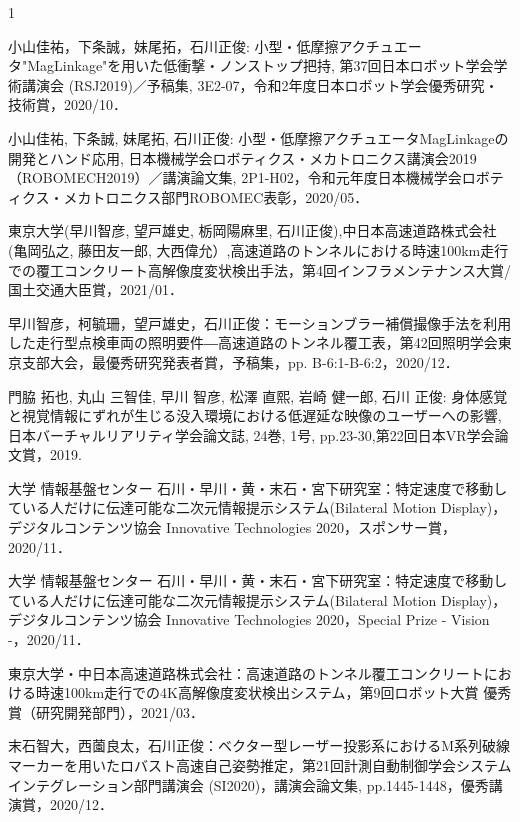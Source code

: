 \begin{受賞}{1}

小山佳祐，下条誠，妹尾拓，石川正俊: 小型・低摩擦アクチュエータ"MagLinkage"を用いた低衝撃・ノンストップ把持, 第37回日本ロボット学会学術講演会 (RSJ2019)／予稿集, 3E2-07，令和2年度日本ロボット学会優秀研究・技術賞，2020/10．

小山佳祐, 下条誠, 妹尾拓, 石川正俊: 小型・低摩擦アクチュエータMagLinkageの開発とハンド応用, 日本機械学会ロボティクス・メカトロニクス講演会2019（ROBOMECH2019）／講演論文集, 2P1-H02，令和元年度日本機械学会ロボティクス・メカトロニクス部門ROBOMEC表彰，2020/05．

東京大学(早川智彦, 望戸雄史, 栃岡陽麻里, 石川正俊),中日本高速道路株式会社(亀岡弘之, 藤田友一郎, 大西偉允）,高速道路のトンネルにおける時速100km走行での覆工コンクリート高解像度変状検出手法，第4回インフラメンテナンス大賞/国土交通大臣賞，2021/01．

早川智彦，柯毓珊，望戸雄史，石川正俊：モーションブラー補償撮像手法を利用した走行型点検車両の照明要件―高速道路のトンネル覆工表，第42回照明学会東京支部大会，最優秀研究発表者賞，予稿集，pp. B-6:1-B-6:2，2020/12．

門脇 拓也, 丸山 三智佳, 早川 智彦, 松澤 直熙, 岩崎 健一郎, 石川 正俊: 身体感覚と視覚情報にずれが生じる没入環境における低遅延な映像のユーザーへの影響,日本バーチャルリアリティ学会論文誌, 24巻, 1号, pp.23-30,第22回日本VR学会論文賞，2019.

大学 情報基盤センター 石川・早川・黄・末石・宮下研究室：特定速度で移動している人だけに伝達可能な二次元情報提示システム(Bilateral Motion Display)，デジタルコンテンツ協会 Innovative Technologies 2020，スポンサー賞，2020/11．

大学 情報基盤センター 石川・早川・黄・末石・宮下研究室：特定速度で移動している人だけに伝達可能な二次元情報提示システム(Bilateral Motion Display)，デジタルコンテンツ協会 Innovative Technologies 2020，Special Prize - Vision -，2020/11．

東京大学・中日本高速道路株式会社：高速道路のトンネル覆工コンクリートにおける時速100km走行での4K高解像度変状検出システム，第9回ロボット大賞 優秀賞（研究開発部門），2021/03．

末石智大，西薗良太，石川正俊：ベクター型レーザー投影系におけるM系列破線マーカーを用いたロバスト高速自己姿勢推定，第21回計測自動制御学会システムインテグレーション部門講演会 (SI2020)，講演会論文集, pp.1445-1448，優秀講演賞，2020/12．


\end{受賞}
